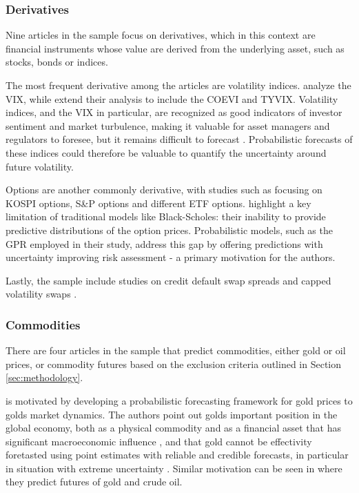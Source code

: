 \subsubsection{Derivatives}
Nine articles in the sample focus on derivatives, which in this context are financial instruments whose value are derived from the underlying asset, such as stocks, bonds or indices. 

The most frequent derivative among the articles are volatility indices. \textcite{hortua2024forecasting, Daniali2021} analyze the VIX, while \textcite{Tian2023} extend their analysis to include the COEVI and TYVIX. Volatility indices, and the VIX in particular, are recognized as good indicators of investor sentiment and market turbulence, making it valuable for asset managers and regulators to foresee, but it remains difficult to forecast \parencite{hortua2024forecasting}. Probabilistic forecasts  of these indices could therefore be valuable to quantify the uncertainty around future volatility.

Options are another commonly derivative, with studies such as \textcite{Park2014gpr} focusing on KOSPI options, \textcite{DeSpiegeleer2018gpr} S\&P options and \textcite{tang2024period} different ETF options. \textcite{Park2014gpr} highlight a key limitation of traditional models like Black-Scholes: their inability to provide predictive distributions of the option prices. Probabilistic models, such as the GPR employed in their study, address this gap by offering predictions with uncertainty improving risk assessment - a primary motivation for the authors. 

Lastly, the sample include studies on credit default swap spreads \parencite{Law2017Practical} and capped volatility swaps \parencite{Hocht2024gpr}. 


\subsubsection{Commodities}
There are four articles in the sample that predict commodities, either gold or oil prices, or commodity futures based on the exclusion criteria outlined in Section \ref{sec:methodology}. 

\textcite{Wang2024GoldForecasting} is motivated by developing a probabilistic forecasting framework for gold prices to golds market dynamics. The authors point out golds important position in the global economy, both as a physical commodity and as a financial asset that has significant macroeconomic influence \parencite{Wang2024GoldForecasting, Pierdzioch2014Efficiency, Pierdzioch2014International}, and that gold cannot be effectivity foretasted using point estimates with reliable and credible forecasts, in particular in situation with extreme uncertainty \parencite{Wang2024GoldForecasting, Li2012Quantile}. Similar motivation can be seen in \textcite{Law2017Practical} where they predict futures of gold and crude oil.  


